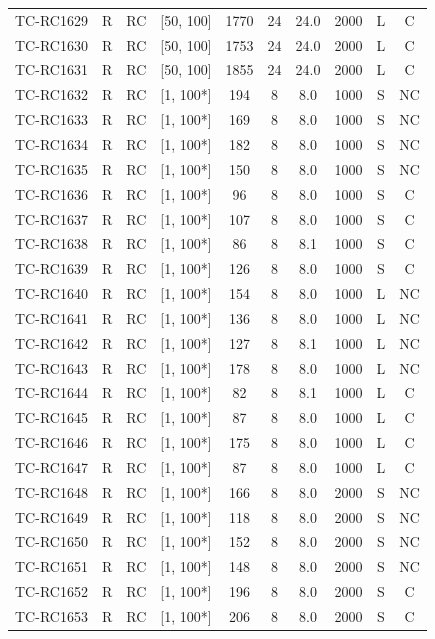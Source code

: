 \begin{longtable}{lccccccccc}
TC-RC1629 & R & RC & [50, 100] & 1770 & 24 & 24.0 & 2000 & L & C \\
TC-RC1630 & R & RC & [50, 100] & 1753 & 24 & 24.0 & 2000 & L & C \\
TC-RC1631 & R & RC & [50, 100] & 1855 & 24 & 24.0 & 2000 & L & C \\
TC-RC1632 & R & RC & [1, 100*] & 194 & 8 & 8.0 & 1000 & S & NC \\
TC-RC1633 & R & RC & [1, 100*] & 169 & 8 & 8.0 & 1000 & S & NC \\
TC-RC1634 & R & RC & [1, 100*] & 182 & 8 & 8.0 & 1000 & S & NC \\
TC-RC1635 & R & RC & [1, 100*] & 150 & 8 & 8.0 & 1000 & S & NC \\
TC-RC1636 & R & RC & [1, 100*] & 96 & 8 & 8.0 & 1000 & S & C \\
TC-RC1637 & R & RC & [1, 100*] & 107 & 8 & 8.0 & 1000 & S & C \\
TC-RC1638 & R & RC & [1, 100*] & 86 & 8 & 8.1 & 1000 & S & C \\
TC-RC1639 & R & RC & [1, 100*] & 126 & 8 & 8.0 & 1000 & S & C \\
TC-RC1640 & R & RC & [1, 100*] & 154 & 8 & 8.0 & 1000 & L & NC \\
TC-RC1641 & R & RC & [1, 100*] & 136 & 8 & 8.0 & 1000 & L & NC \\
TC-RC1642 & R & RC & [1, 100*] & 127 & 8 & 8.1 & 1000 & L & NC \\
TC-RC1643 & R & RC & [1, 100*] & 178 & 8 & 8.0 & 1000 & L & NC \\
TC-RC1644 & R & RC & [1, 100*] & 82 & 8 & 8.1 & 1000 & L & C \\
TC-RC1645 & R & RC & [1, 100*] & 87 & 8 & 8.0 & 1000 & L & C \\
TC-RC1646 & R & RC & [1, 100*] & 175 & 8 & 8.0 & 1000 & L & C \\
TC-RC1647 & R & RC & [1, 100*] & 87 & 8 & 8.0 & 1000 & L & C \\
TC-RC1648 & R & RC & [1, 100*] & 166 & 8 & 8.0 & 2000 & S & NC \\
TC-RC1649 & R & RC & [1, 100*] & 118 & 8 & 8.0 & 2000 & S & NC \\
TC-RC1650 & R & RC & [1, 100*] & 152 & 8 & 8.0 & 2000 & S & NC \\
TC-RC1651 & R & RC & [1, 100*] & 148 & 8 & 8.0 & 2000 & S & NC \\
TC-RC1652 & R & RC & [1, 100*] & 196 & 8 & 8.0 & 2000 & S & C \\
TC-RC1653 & R & RC & [1, 100*] & 206 & 8 & 8.0 & 2000 & S & C \\

\end{longtable}
